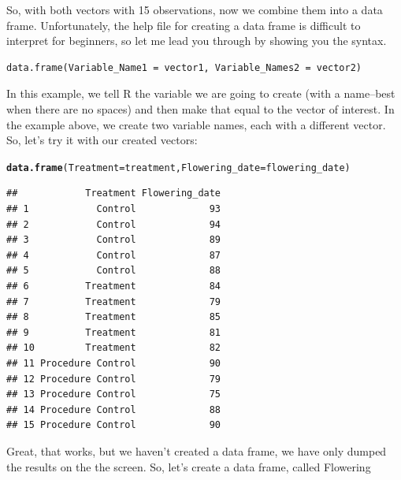 \documentclass{tufte-handout}\usepackage[]{graphicx}\usepackage[]{xcolor}
\makeatletter
\newcommand{\hlstd}[1]{\textcolor[rgb]{0.345,0.345,0.345}{#1}}%
\newcommand{\hlkwc}[1]{\textcolor[rgb]{0.333,0.667,0.333}{#1}}%
\newcommand{\hlkwd}[1]{\textcolor[rgb]{0.737,0.353,0.396}{\textbf{#1}}}%
\newenvironment{kframe}{%
 \def\at@end@of@kframe{}%
 \ifinner\ifhmode%
  \def\at@end@of@kframe{\end{minipage}}%
  \begin{minipage}{\columnwidth}%
 \fi\fi%
 \def\FrameCommand##1{\hskip\@totalleftmargin \hskip-\fboxsep
 \colorbox{shadecolor}{##1}\hskip-\fboxsep
     \hskip-\linewidth \hskip-\@totalleftmargin \hskip\columnwidth}%
 \MakeFramed {\advance\hsize-\width
   \@totalleftmargin\z@ \linewidth\hsize
   \@setminipage}}%
 {\par\unskip\endMakeFramed%
 \at@end@of@kframe}
\newenvironment{knitrout}{}{} %
\makeatother
\begin{document}
So, with both vectors with 15 observations, now we combine them into a data frame. Unfortunately, the help file for creating a data frame is difficult to interpret for beginners, so let me lead you through by showing you the syntax.

\begin{fullwidth}
\begin{verbatim}
data.frame(Variable_Name1 = vector1, Variable_Names2 = vector2)
\end{verbatim}
\end{fullwidth}
\medskip

In this example, we tell R the variable we are going to create (with a name--best when there are no spaces) and then make that equal to the vector of interest. In the example above, we create two variable names, each with a different vector.  So, let's try it with our created vectors:



\begin{knitrout}
\color{fgcolor}\begin{kframe}
\begin{alltt}
\hlkwd{data.frame}\hlstd{(}\hlkwc{Treatment} \hlstd{= treatment,} \hlkwc{Flowering_date} \hlstd{= flowering_date)}
\end{alltt}
\begin{verbatim}
##            Treatment Flowering_date
## 1            Control             93
## 2            Control             94
## 3            Control             89
## 4            Control             87
## 5            Control             88
## 6          Treatment             84
## 7          Treatment             79
## 8          Treatment             85
## 9          Treatment             81
## 10         Treatment             82
## 11 Procedure Control             90
## 12 Procedure Control             79
## 13 Procedure Control             75
## 14 Procedure Control             88
## 15 Procedure Control             90
\end{verbatim}
\end{kframe}
\end{knitrout}

Great, that works, but we haven't created a data frame, we have only dumped the results on the the screen. So, let's create a data frame, called Flowering
\end{document}
